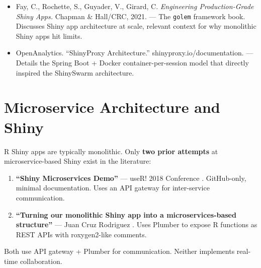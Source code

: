 \documentclass[12pt,a4paper]{article}
\begin{document}
\begin{addedsource}
\begin{itemize}[nosep]
  \item Fay, C., Rochette, S., Guyader, V., Girard, C. \textit{Engineering Production-Grade Shiny Apps.} Chapman \& Hall/CRC, 2021. --- The \texttt{golem} framework book. Discusses Shiny app architecture at scale, relevant context for why monolithic Shiny apps hit limits.
  \item OpenAnalytics. ``ShinyProxy Architecture.'' shinyproxy.io/documentation. --- Details the Spring Boot + Docker container-per-session model that directly inspired the ShinySwarm architecture.
\end{itemize}
\end{addedsource}

\section{Microservice Architecture and Shiny}

R Shiny apps are typically monolithic. Only \textbf{two prior attempts} at microservice-based Shiny exist in the literature:

\begin{enumerate}[nosep]
  \item \textbf{``Shiny Microservices Demo''} --- useR! 2018 Conference \cite{brokamp2018}. GitHub-only, minimal documentation. Uses an API gateway for inter-service communication.
  \item \textbf{``Turning our monolithic Shiny app into a microservices-based structure''} --- Juan Cruz Rodriguez \cite{rodriguez2021}. Uses Plumber \cite{plumber2025} to expose R functions as REST APIs with roxygen2-like comments.
\end{enumerate}

Both use API gateway + Plumber for communication. Neither implements real-time collaboration.
\end{document}
